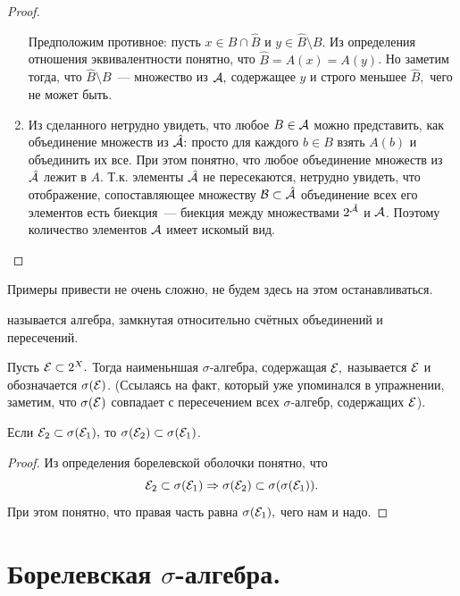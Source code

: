 \documentclass{notes}
\begin{document}
\begin{exc}
\begin{proof}
\begin{enumerate}
				Предположим противное: пусть $x \in B \cap \hat{B}$ и $y \in \hat{B} \setminus B$. Из определения отношения эквивалентности понятно, что $\hat{B} = A(x) = A(y)$. Но заметим тогда, что $\hat{B} \setminus B$~--- множество из $\mathcal{A},$ содержащее $y$ и строго меньшее $\hat{B},$ чего не может быть.
				\item Из сделанного нетрудно увидеть, что любое $B \in \mathcal{A}$ можно представить, как объединение множеств из $\hat{\mathcal{A}}\text{\text{:}}$ просто для каждого $b \in B$ взять $A(b)$ и объединить их все. При этом понятно, что любое объединение множеств из $\hat{\mathcal{A}}$ лежит в $A$. Т.к. элементы $\hat{\mathcal{A}}$ не пересекаются, нетрудно увидеть, что отображение, сопоставляющее множеству $\mathcal{B} \subset \hat{\mathcal{A}}$ объединение всех его элементов есть биекция~--- биекция между множествами $2^{\hat{\mathcal{A}}}$ и $\mathcal{A}$. Поэтому количество элементов $\mathcal{A}$ имеет искомый вид.
			\end{enumerate}
		\end{proof}
	\end{exc}

	Примеры привести не очень сложно, не будем здесь на этом останавливаться.

	\begin{de}
		 называется алгебра, замкнутая относительно счётных объединений и пересечений.
	\end{de}

	\begin{de}
		Пусть $\mathcal{E} \subset 2^X.$ Тогда наименьншая $\sigma$-алгебра, содержащая $\mathcal{E},$ называется  $\mathcal{E}$ и обозначается $\sigma(\mathcal{E})$. (Ссылаясь на факт, который уже упоминался в упражнении, заметим, что $\sigma(\mathcal{E})$ совпадает с пересечением всех $\sigma$-алгебр, содержащих $\mathcal{E}$).
	\end{de}

	\begin{lm}
		Если $\mathcal{E}_2 \subset \sigma(\mathcal{E}_1),$ то $\sigma(\mathcal{E}_2) \subset \sigma(\mathcal{E}_1)$.
		\begin{proof}
			Из определения борелевской оболочки понятно, что 
			\[
				\mathcal{E}_2 \subset \sigma(\mathcal{E}_1) \Rightarrow \sigma(\mathcal{E}_2) \subset \sigma(\sigma(\mathcal{E}_1)).
			\]
			При этом понятно, что правая часть равна $\sigma(\mathcal{E}_1),$ чего нам и надо.
		\end{proof}
	\end{lm}

\section{Борелевская \texorpdfstring{$\sigma$}{σ}-алгебра.}
\end{document}
